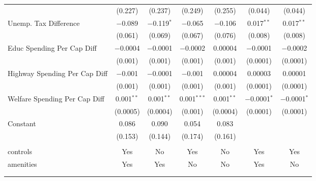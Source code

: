 \begin{table}[!htbp]
\begin{tabular}{@{\extracolsep{5pt}}lcccccc}
  & (0.227) & (0.237) & (0.249) & (0.255) & (0.044) & (0.044) \\ 
  Unemp. Tax Difference & $-$0.089 & $-$0.119$^{*}$ & $-$0.065 & $-$0.106 & 0.017$^{**}$ & 0.017$^{**}$ \\ 
  & (0.061) & (0.069) & (0.067) & (0.076) & (0.008) & (0.008) \\ 
  Educ Spending Per Cap Diff & $-$0.0004 & $-$0.0001 & $-$0.0002 & 0.00004 & $-$0.0001 & $-$0.0002 \\ 
  & (0.001) & (0.001) & (0.001) & (0.001) & (0.0001) & (0.0001) \\ 
  Highway Spending Per Cap Diff & $-$0.001 & $-$0.0001 & $-$0.001 & 0.00004 & 0.00003 & 0.00001 \\ 
  & (0.001) & (0.001) & (0.001) & (0.001) & (0.0001) & (0.0001) \\ 
  Welfare Spending Per Cap Diff & 0.001$^{**}$ & 0.001$^{**}$ & 0.001$^{***}$ & 0.001$^{**}$ & $-$0.0001$^{*}$ & $-$0.0001$^{*}$ \\ 
  & (0.0005) & (0.0004) & (0.001) & (0.0004) & (0.0001) & (0.0001) \\ 
  Constant & 0.086 & 0.090 & 0.054 & 0.083 &  &  \\ 
  & (0.153) & (0.144) & (0.174) & (0.161) &  &  \\ 
 \hline \\[-1.8ex] 
controls & Yes & No & Yes & No & Yes & Yes \\ 
amenities & Yes & Yes & No & No & Yes & No \\ 
\hline \\[-1.8ex] 
\hline 
\hline \\[-1.8ex] 
\end{tabular} 
\end{table} 
